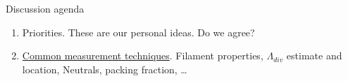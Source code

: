 \documentclass[10pt, compress]{beamer}
\begin{document}
\begin{frame}{Discussion agenda}
	\begin{enumerate}
		\item Priorities. These are our personal ideas. Do we agree? 
		\item \underline{Common measurement techniques}. Filament
                  properties, $\Lambda_{div}$ estimate and location,
                  Neutrals, packing fraction, \ldots 
 	\end{enumerate}
\end{frame}
\end{document}
